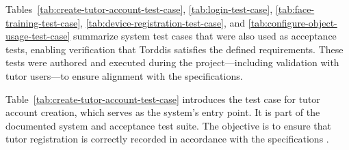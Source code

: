                 Tables~\ref{tab:create-tutor-account-test-case}, \ref{tab:login-test-case}, \ref{tab:face-training-test-case}, \ref{tab:device-registration-test-case}, and \ref{tab:configure-object-usage-test-case} summarize system test cases that were also used as acceptance tests, enabling verification that Torddis satisfies the defined requirements. These tests were authored and executed during the project—including validation with tutor users—to ensure alignment with the specifications.
                
                Table~\ref{tab:create-tutor-account-test-case} introduces the test case for tutor account creation, which serves as the system’s entry point. It is part of the documented system and acceptance test suite. The objective is to ensure that tutor registration is correctly recorded in accordance with the specifications \citep{Sciarra2024Smash}.
                
